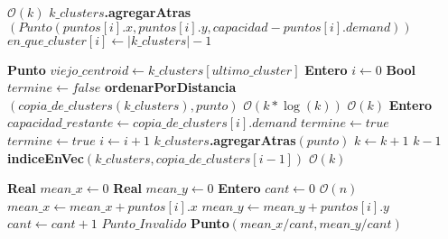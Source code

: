 \begin{algorithm}[H]
	\caption{\Comment $\mathcal{O}(k)$}
	\label{inicializar-clusters}
	\begin{algorithmic}[1]
		 \Comment $\mathcal{O}(k)$
		\State $k\_clusters$\textbf{.agregarAtras}$(Punto(puntos[i].x, puntos[i].y, capacidad - puntos[i].demand))$
		\State $en\_que\_cluster[i] \gets |k\_clusters|-1$
		\EndFor
		\EndFunction
	\end{algorithmic}
\end{algorithm}

\begin{algorithm}[H]
	\caption{\Comment $\mathcal{O}(k*\log(k))$}
	\begin{algorithmic}[1]
		\State \textbf{Punto } $viejo\_centroid \gets k\_clusters[ultimo\_cluster]$
		\State \textbf{Entero } $i \gets 0$
		\State \textbf{Bool } $termine \gets false$
		\State \textbf{ordenarPorDistancia}$(copia\_de\_clusters(k\_clusters), punto)$ \Comment $\mathcal{O}(k*\log(k))$
		\Statex
		 \Comment $\mathcal{O}(k)$
		\State \textbf{Entero } $capacidad\_restante \gets copia\_de\_clusters[i].demand$ 
		\State $termine \gets true$
		\EndIf
		\Else
		\State $termine \gets true$
		\EndIf
		\State $i \gets i+1$
		\EndWhile
		\Statex
		\State $k\_clusters$\textbf{.agregarAtras}$(punto)$
		\State $k \gets k+1$
		\State \Return $k-1$
		\EndIf
		\State \Return \textbf{indiceEnVec}$(k\_clusters, copia\_de\_clusters[i-1])$  \Comment $\mathcal{O}(k)$
		\EndFunction
	\end{algorithmic}
\end{algorithm}

\begin{algorithm}[H]
	\caption{\Comment $\mathcal{O}(n)$}
	\label{calcular-centroid}
	\begin{algorithmic}[1]
		\State \textbf{Real } $mean\_x \gets 0$
		\State \textbf{Real } $mean\_y \gets 0$
		\State \textbf{Entero } $cant \gets 0$
		 \Comment $\mathcal{O}(n)$
		\State $mean\_x \gets mean\_x + puntos[i].x$
		\State $mean\_y \gets mean\_y + puntos[i].y$
		\State $cant \gets cant+1$
		\EndIf
		\EndFor
		\State \Return $Punto\_Invalido$
		\EndIf
		\State \Return \textbf{Punto}$(mean\_x/cant, mean\_y/cant)$
		\EndFunction
	\end{algorithmic}
\end{algorithm}

